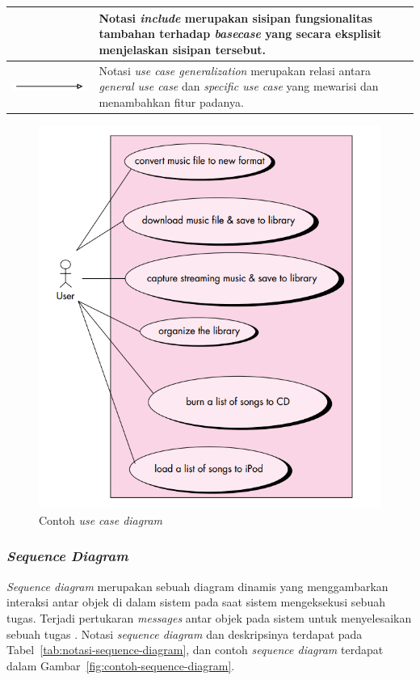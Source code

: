 \begin{longtable}{|>{\centering}m{5cm}|m{7cm}|}
                         & Notasi \emph{include} merupakan sisipan
                           fungsionalitas tambahan terhadap
                           \emph{basecase} yang secara eksplisit
                           menjelaskan sisipan tersebut. \\\hline
  \includegraphics[width=.6\linewidth]{img/uml-notation/general}
                         & Notasi \emph{use case generalization}
                           merupakan relasi antara \emph{general use
                           case} dan \emph{specific use case} yang
                           mewarisi dan menambahkan fitur padanya. \\\hline
\end{longtable}

\begin{figure}[tph]
  \centering
  \includegraphics[width=.5\linewidth]{img/contoh-use-case}
  \caption{Contoh \emph{use case diagram} \parencite{pressman2010software}}\label{fig:contoh-use-case}
\end{figure}


\subsubsection{\emph{Sequence Diagram}}

\emph{Sequence diagram} merupakan sebuah diagram dinamis yang
menggambarkan interaksi antar objek di dalam sistem pada saat sistem
mengeksekusi sebuah tugas. Terjadi pertukaran \emph{messages} antar
objek pada sistem untuk menyelesaikan sebuah tugas
\parencite{pressman2010software}. Notasi \emph{sequence diagram} dan
deskripsinya terdapat pada Tabel~\ref{tab:notasi-sequence-diagram},
dan contoh \emph{sequence diagram} terdapat dalam
Gambar~\ref{fig:contoh-sequence-diagram}.


